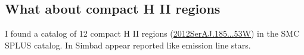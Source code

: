 \documentclass[11pt]{article}
\begin{document}
\newpage
\begin{longtable}{ccc}
  
\end{longtable}





% 


\newpage
\begin{longtable}{ccc}

  
\end{longtable}

\subsection{What about compact H II regions}
\label{sec:ini}

I found a catalog of 12 compact H II regions (\url{2012SerAJ.185...53W}) in the SMC SPLUS
   catalog. In Simbad appear reported like emission line stars.

\begin{figure}
\end{figure}
\end{document}
